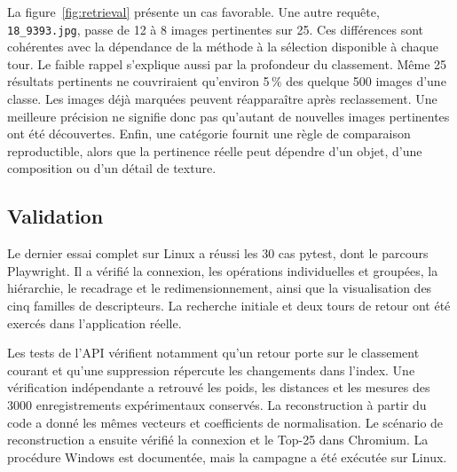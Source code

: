 La figure~\ref{fig:retrieval} présente un cas favorable. Une autre requête, \texttt{18\_9393.jpg}, passe de 12 à 8 images pertinentes sur 25. Ces différences sont cohérentes avec la dépendance de la méthode à la sélection disponible à chaque tour. Le faible rappel s'explique aussi par la profondeur du classement. Même 25 résultats pertinents ne couvriraient qu'environ 5\,\% des quelque 500 images d'une classe. Les images déjà marquées peuvent réapparaître après reclassement. Une meilleure précision ne signifie donc pas qu'autant de nouvelles images pertinentes ont été découvertes. Enfin, une catégorie fournit une règle de comparaison reproductible, alors que la pertinence réelle peut dépendre d'un objet, d'une composition ou d'un détail de texture.

\subsection{Validation}
Le dernier essai complet sur Linux a réussi les 30 cas pytest, dont le parcours Playwright. Il a vérifié la connexion, les opérations individuelles et groupées, la hiérarchie, le recadrage et le redimensionnement, ainsi que la visualisation des cinq familles de descripteurs. La recherche initiale et deux tours de retour ont été exercés dans l'application réelle.

Les tests de l'API vérifient notamment qu'un retour porte sur le classement courant et qu'une suppression répercute les changements dans l'index. Une vérification indépendante a retrouvé les poids, les distances et les mesures des \num{3000} enregistrements expérimentaux conservés. La reconstruction à partir du code a donné les mêmes vecteurs et coefficients de normalisation. Le scénario de reconstruction a ensuite vérifié la connexion et le Top-25 dans Chromium. La procédure Windows est documentée, mais la campagne a été exécutée sur Linux.
